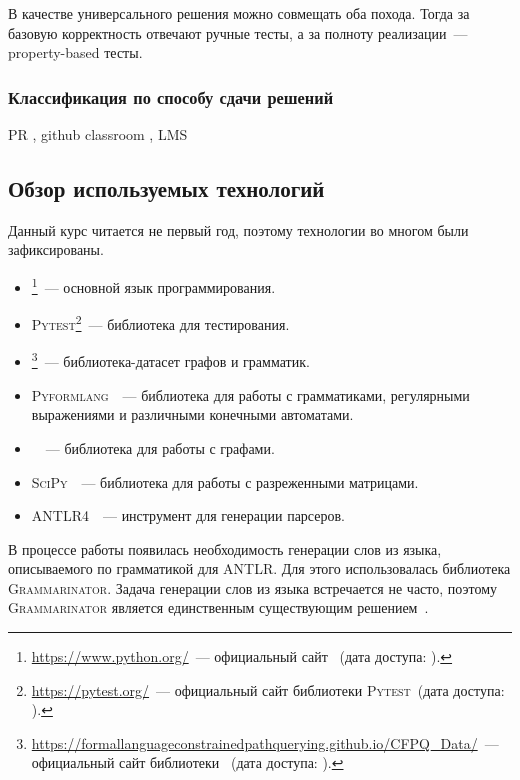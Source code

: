 В качестве универсального решения можно совмещать оба похода.
Тогда за базовую корректность отвечают ручные тесты, а за полноту реализации~--- property-based тесты.

\subsubsection{Классификация по способу сдачи решений}

PR , github classroom , LMS 


\subsection{Обзор используемых технологий}

Данный курс читается не первый год, поэтому технологии во многом были зафиксированы.
\begin{itemize}
    \item \python{}\footnote{\url{https://www.python.org/}~--- официальный сайт \python{}~(дата доступа: ).}~--- основной язык программирования.
    \item \textsc{Pytest}\footnote{\url{https://pytest.org/}~--- официальный сайт библиотеки \textsc{Pytest}~(дата доступа: ).}~--- библиотека для тестирования.
    \item \cfpqdata{}\footnote{\url{https://formallanguageconstrainedpathquerying.github.io/CFPQ_Data/}~--- официальный сайт библиотеки \cfpqdata{}~(дата доступа: ).}~--- библиотека-датасет графов и грамматик.
    \item \textsc{Pyformlang}~\cite{romeroPyformlangEducationalLibrary2021}~--- библиотека для работы с грамматиками, регулярными выражениями и различными конечными автоматами.
    \item \networkx{}~\cite{SciPyProceedings_11}~--- библиотека для работы с графами.
    \item \textsc{SciPy}~\cite{virtanenSciPyFundamentalAlgorithms2020}~--- библиотека для работы с разреженными матрицами.
    \item \textsc{ANTLR4}~\cite{parrDefinitiveANTLRReference2013}~--- инструмент для генерации парсеров.
\end{itemize}

В процессе работы появилась необходимость генерации слов из языка, описываемого по грамматикой для ANTLR.
Для этого использовалась библиотека \textsc{Grammarinator}.
Задача генерации слов из языка встречается не часто, поэтому \textsc{Grammarinator} является единственным существующим решением~\cite{GeneratingGrammarconformantTexts}.
